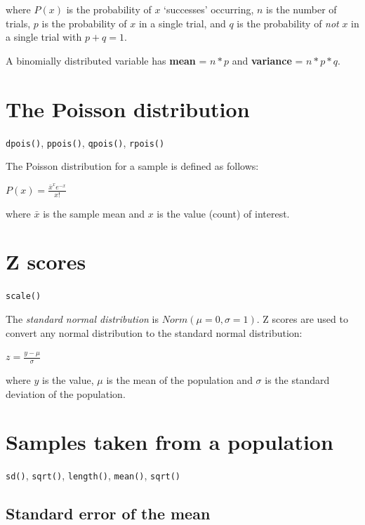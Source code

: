 \documentclass[
  11pt,
  a4paper,
]{book}
\begin{document}
where \(P(x)\) is the probability of \(x\) `successes' occurring, \(n\) is the number of trials, \(p\) is the probability of \(x\) in a single trial, and \(q\) is the probability of \emph{not} \(x\) in a single trial with \(p+q=1\).

A binomially distributed variable has \textbf{mean} = \(n*p\) and \textbf{variance} = \(n*p*q\).

\hypertarget{the-poisson-distribution-1}{%
\section{The Poisson distribution}\label{the-poisson-distribution-1}}

\texttt{dpois()}, \texttt{ppois()}, \texttt{qpois()}, \texttt{rpois()}

The Poisson distribution for a sample is defined as follows:

\(P(x) = \frac{\bar{x}^x e^{-x}}{x!}\)

where \(\bar{x}\) is the sample mean and \(x\) is the value (count) of interest.

\hypertarget{z-scores}{%
\section{Z scores}\label{z-scores}}

\texttt{scale()}

The \emph{standard normal distribution} is \(Norm(\mu=0, \sigma=1)\). Z scores are used to convert any normal distribution to the standard normal distribution:

\(z = \frac{y-\mu}{\sigma}\)

where \(y\) is the value, \(\mu\) is the mean of the population and \(\sigma\) is the standard deviation of the population.

\hypertarget{samples-taken-from-a-population}{%
\section{Samples taken from a population}\label{samples-taken-from-a-population}}

\texttt{sd()}, \texttt{sqrt()}, \texttt{length()}, \texttt{mean()}, \texttt{sqrt()}

\hypertarget{standard-error-of-the-mean}{%
\subsection{Standard error of the mean}\label{standard-error-of-the-mean}}
\end{document}
